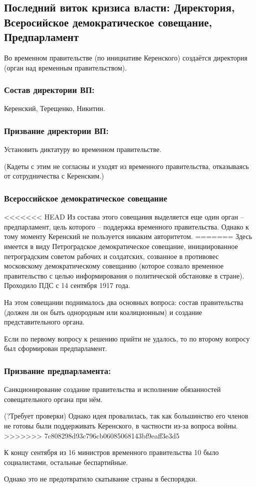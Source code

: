 \subsection{Последний виток кризиса власти: Директория, Всеросийское демократическое совещание, Предпарламент}

Во временном правительстве (по инициативе Керенского) создаётся директория (орган над временным правительством).

\subsubsection{\textbf{Состав директории ВП:}}

Керенский, Терещенко, Никитин.

\subsubsection{\textbf{Призвание директории ВП:}}

Установить диктатуру во временном правительстве.

(Кадеты с этим не согласны и уходят из временного правительства, отказываясь от сотрудничества с Керенским.)

\subsubsection{\textbf{Всероссийское демократическое совещание}}

<<<<<<< HEAD
Из состава этого совещания выделяется еще один орган – предпарламент, цель которого -- поддержка временного правительства. Однако к тому моменту Керенский не пользуется никаким авторитетом.
=======
Здесь имеется в виду Петроградское демократическое совещание, инициированное петроградским советом рабочих и солдатских, созванное в противовес московскому демократическому совещанию (которое созвало временное правительство с целью информирования о политической обстановке в стране). Проходило ПДС с 14 сентября 1917 года. 

На этом совещании поднималось два основных вопроса: состав правительства (должен ли он быть однородным или коалиционным) и создание представительного органа.

Если по первому вопросу к решению прийти не удалось, то по второму вопросу был сформирован предпарламент.

\subsubsection{\textbf{Призвание предпарламента:}}
 
Санкционирование создание правительства и исполнение обязанностей совещательного органа при нём.

(?Требует проверки) Однако идея провалилась, так как большинство его членов не готовы были поддерживать Керенского, в частности из-за вопроса войны.
>>>>>>> 7c808298d93c796cb06085068143bf9eaff3e3d5

К концу сентября из 16 министров временного правительства 10 было социалистами, остальные беспартийные.

Однако это не предотвратило скатывание страны в беспорядки.